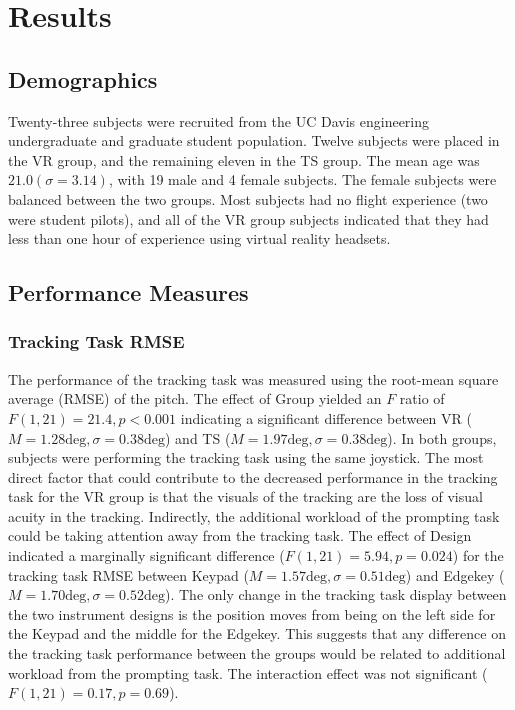 \section{Results}

\subsection{Demographics}

Twenty-three subjects were recruited from the UC Davis engineering undergraduate and graduate student population.
Twelve subjects were placed in the VR group, and the remaining eleven in the TS group.
The mean age was $21.0 (\sigma = 3.14)$, with 19 male and 4 female subjects.
The female subjects were balanced between the two groups.
Most subjects had no flight experience (two were student pilots), and all of the VR group subjects indicated that they had less than one hour of experience using virtual reality headsets.

\subsection{Performance Measures}

\subsubsection{Tracking Task RMSE}

The performance of the tracking task was measured using the root-mean square average (RMSE) of the pitch.
The effect of Group yielded an $F$ ratio of $F(1, 21) = 21.4, p < 0.001$ indicating a significant difference between VR ($M=1.28\mathrm{deg}, \sigma=0.38\mathrm{deg}$) and TS ($M=1.97\mathrm{deg}, \sigma=0.38\mathrm{deg}$).
In both groups, subjects were performing the tracking task using the same joystick.
The most direct factor that could contribute to the decreased performance in the tracking task for the VR group is that the visuals of the tracking are the loss of visual acuity in the tracking.
Indirectly, the additional workload of the prompting task could be taking attention away from the tracking task.
The effect of Design indicated a marginally significant difference ($F(1, 21) = 5.94, p=0.024$) for the tracking task RMSE between Keypad ($M=1.57\mathrm{deg}, \sigma=0.51\mathrm{deg}$) and Edgekey ($M=1.70\mathrm{deg}, \sigma=0.52\mathrm{deg}$).
The only change in the tracking task display between the two instrument designs is the position moves from being on the left side for the Keypad and the middle for the Edgekey.
This suggests that any difference on the tracking task performance between the groups would be related to additional workload from the prompting task.
The interaction effect was not significant ($F(1, 21) = 0.17, p=0.69$).

